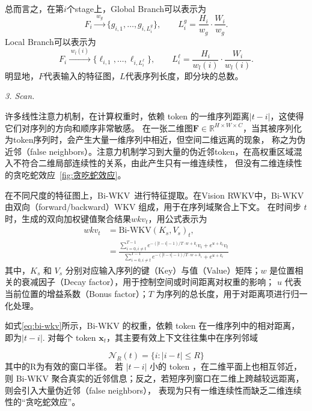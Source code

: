 \documentclass[conference]{IEEEtran}   %
\begin{document}
总而言之，在第$i$个stage上，Global Branch可以表示为
\begin{equation}
    F_i \xrightarrow{\;w_g\;} \{g_{i,1},\dots,g_{i,L_i^g}\},\qquad 
L_i^g=\frac{H_i}{w_g}\cdot\frac{W_i}{w_g}.
\label{global-branch}
\end{equation}
Local Branch可以表示为
\begin{equation}
    F_i \xrightarrow{\;w_l(i)\;} \{\ell_{i,1},\dots,\ell_{i,L_i^\ell}\},\qquad 
L_i^\ell=\frac{H_i}{w_l(i)}\cdot\frac{W_i}{w_l(i)}.
\label{local-branch}
\end{equation}
明显地，$F$代表输入的特征图，$L$代表序列长度，即分块的总数。

\textit{3. Scan.}

许多线性注意力机制，在计算权重时，依赖 token 的一维序列距离$|t-i|$，这使得它们对序列的方向和顺序非常敏感。
在一张二维图$\mathbf{F}\in\mathbb{R}^{H\times W\times C}$，当其被序列化为token序列时，会产生大量一维序列中相近，但空间二维远离的现象，
称之为伪近邻（false neighbors）。注意力机制学习到大量的伪近邻token，在高权重区域混入不符合二维局部连续性的关系，由此产生只有一维连续性，
但没有二维连续性的贪吃蛇效应~\ref{fig:贪吃蛇效应}。

在不同尺度的特征图上，Bi-WKV~\cite{vrwkv}进行特征提取。在Vision RWKV中，Bi-WKV 由双向（forward/backward）WKV 组成，用于在序列域聚合上下文。
在时间步 $t$ 时，生成的双向加权键值聚合结果$wkv_t$，用公式表示为
\begin{equation}
\begin{aligned}
wkv_t &= \text{Bi-WKV}(K_s, V_s)_t, \\
&= \frac{\sum_{i=0, i \neq t}^{T-1} e^{-(|t-i|-1)/T \cdot w + k_i} v_i + e^{u+k_t} v_t}{\sum_{i=0, i \neq t}^{T-1} e^{-(|t-i|-1)/T \cdot w + k_i} + e^{u+k_t}}
\end{aligned}
\label{eq:bi-wkv}
\end{equation}
其中，$K_s$ 和 $V_s$ 分别对应输入序列的键（Key）与值（Value）矩阵；$w$ 是位置相关的衰减因子（Decay factor），用于控制空间或时间距离对权重的影响；
$u$ 代表当前位置的增益系数（Bonus factor）；$T$ 为序列的总长度，用于对距离项进行归一化处理。

如式\ref{eq:bi-wkv}所示，Bi-WKV 的权重，依赖 token 在一维序列中的相对距离，即为$|t-i|$.
对每个 token $\mathbf{x}_t$，其主要有效上下文往往集中在序列邻域 

\begin{equation}\label{eq:paper-auto-05}
\mathcal{N}_R(t) = \{i: |i - t| \le R\}
\end{equation}
其中的R为有效的窗口半径。
若 $|t-i|$ 小的 token ，在二维平面上也相互邻近，则 Bi-WKV 聚合真实的近邻信息；反之，若短序列窗口在二维上跨越较远距离，则会引入大量伪近邻（false neighbors），
表现为只有一维连续性而缺乏二维连续性的“贪吃蛇效应”。
\end{document}
